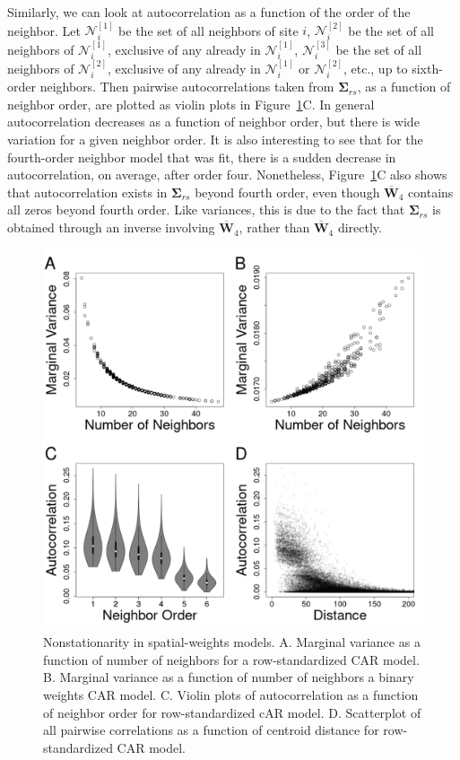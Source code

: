 \documentclass[12pt, titlepage]{article}
\begin{document}
Similarly, we can look at autocorrelation as a function of the order of the neighbor. Let $\mathcal{N}_{i}^{[1]}$ be the set of all neighbors of site $i$, $\mathcal{N}_{i}^{[2]}$ be the set of all neighbors of $\mathcal{N}_{i}^{[1]}$, exclusive of any already in $\mathcal{N}_{i}^{[1]}$, $\mathcal{N}_{i}^{[3]}$ be the set of all neighbors of $\mathcal{N}_{i}^{[2]}$, exclusive of any already in $\mathcal{N}_{i}^{[1]}$ or $\mathcal{N}_{i}^{[2]}$, etc., up to sixth-order neighbors.  Then pairwise autocorrelations taken from $\boldsymbol{\Sigma}_{rs}$, as a function of neighbor order, are plotted as violin plots in Figure~\ref{Fig:seals_nonstationary}C.  In general autocorrelation decreases as a function of neighbor order, but there is wide variation for a given neighbor order.  It is also interesting to see that for the fourth-order neighbor model that was fit, there is a sudden decrease in autocorrelation, on average, after order four. Nonetheless, Figure~\ref{Fig:seals_nonstationary}C also shows that autocorrelation exists in $\boldsymbol{\Sigma}_{rs}$ beyond fourth order, even though $\overline{\mathbf{W}}_{4}$ contains all zeros beyond fourth order.  Like variances, this is due to the fact that $\boldsymbol{\Sigma}_{rs}$ is obtained through an inverse involving $\overline{\mathbf{W}}_{4}$, rather than $\overline{\mathbf{W}}_{4}$ directly.
 \begin{figure}[H]
  \begin{center}
	    \includegraphics[width=.8\linewidth]{Seals_nonstationary}
  \end{center}
  \caption{Nonstationarity in spatial-weights models. A. Marginal variance as a function of number of neighbors for a row-standardized CAR model. B. Marginal variance as a function of number of neighbors a binary weights CAR model. C. Violin plots of autocorrelation as a function of neighbor order for row-standardized cAR model. D. Scatterplot of all pairwise correlations as a function of centroid distance for row-standardized CAR model. \label{Fig:seals_nonstationary}}
\end{figure}
\end{document}

